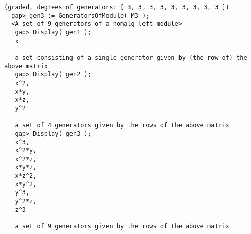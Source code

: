\documentclass[a4paper,11pt]{report}
\begin{document}
{{{\begin{Verbatim}[fontsize=\small,frame=single,label=Example]
  (graded, degrees of generators: [ 3, 3, 3, 3, 3, 3, 3, 3, 3 ])
  gap> gen3 := GeneratorsOfModule( M3 );
  <A set of 9 generators of a homalg left module>
   gap> Display( gen1 );
   x
   
   a set consisting of a single generator given by (the row of) the above matrix
   gap> Display( gen2 );
   x^2,
   x*y,
   x*z,
   y^2 
   
   a set of 4 generators given by the rows of the above matrix
   gap> Display( gen3 );
   x^3,  
   x^2*y,
   x^2*z,
   x*y*z,
   x*z^2,
   x*y^2,
   y^3,  
   y^2*z,
   z^3   
   
   a set of 9 generators given by the rows of the above matrix
\end{Verbatim}
 }

 }

  }

   
\end{document}
